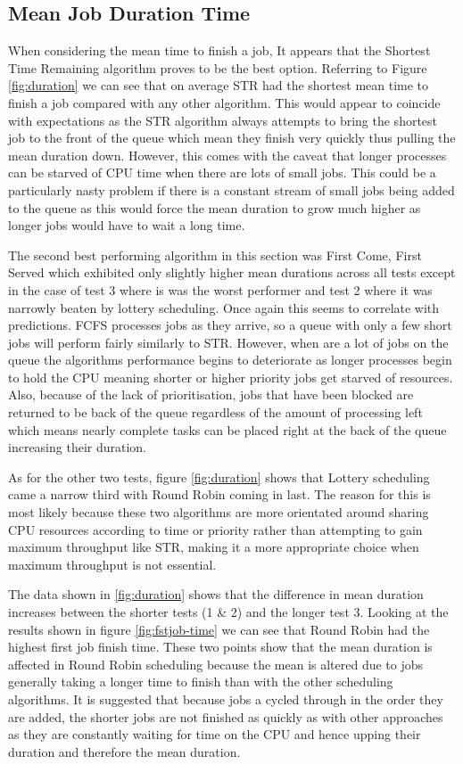 \documentclass{acm_proc_article-sp}
\begin{document}
\subsection{Mean Job Duration Time}
When considering the mean time to finish a job, It appears that the Shortest Time Remaining algorithm proves to be the best option. Referring to Figure \ref{fig:duration} we can see that on average STR had the shortest mean time to finish a job compared with any other algorithm. This would appear to coincide with expectations as the STR algorithm always attempts to bring the shortest job to the front of the queue which mean they finish very quickly thus pulling the mean duration down. However, this comes with the caveat that longer processes can be starved of CPU time when there are lots of small jobs. This could be a particularly nasty problem if there is a constant stream of small jobs being added to the queue as this would force the mean duration to grow much higher as longer jobs would have to wait a long time.

The second best performing algorithm in this section was First Come, First Served which exhibited only slightly higher mean durations across all tests except in the case of test 3 where is was the worst performer and test 2 where it was narrowly beaten by lottery scheduling. Once again this seems to correlate with predictions. FCFS processes jobs as they arrive, so a queue with only a few short jobs will perform fairly similarly to STR. However, when are a lot of jobs on the queue the algorithms performance begins to deteriorate as longer processes begin to hold the CPU meaning shorter or higher priority jobs get starved of resources. Also, because of the lack of prioritisation, jobs that have been blocked are returned to be back of the queue regardless of the amount of processing left which means nearly complete tasks can be placed right at the back of the queue increasing their duration.

As for the other two tests, figure \ref{fig:duration} shows that Lottery scheduling came a narrow third with Round Robin coming in last. The reason for this is most likely because these two algorithms are more orientated around sharing CPU resources according to time or priority rather than attempting to gain maximum throughput like STR, making it a more appropriate choice when maximum throughput is not essential.

The data shown in \ref{fig:duration} shows that the difference in mean duration increases between the shorter tests (1 \& 2) and the longer test 3. Looking at the results shown in figure \ref{fig:fstjob-time} we can see that Round Robin had the highest first job finish time. These two points show that the mean duration is affected in Round Robin scheduling because the mean is altered due to jobs generally taking a longer time to finish than with the other scheduling algorithms. It is suggested that because jobs a cycled through in the order they are added, the shorter jobs are not finished as quickly as with other approaches as they are constantly waiting for time on the CPU and hence upping their duration and therefore the mean duration.
\end{document}
